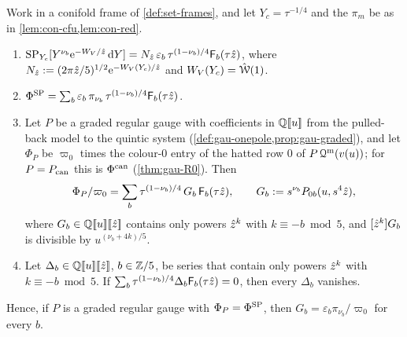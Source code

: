 \begin{lem}
\label{lem:con-id}
Work in a conifold frame of \cref{def:set-frames}, and let $Y_c=\tau^{-1/4}$ and the $\pi_m$ be as in \cref{lem:con-cfu,lem:con-red}.
\begin{enumerate}
\item[(a)] $\mathrm{SP}_{Y_c}[Y^{\nu_b}\mathrm{e}^{-W_V/\hat{z}}\,\mathrm{d} Y]=N_{\hat{z}}\,\varepsilon_b\,\tau^{(1-\nu_b)/4}\mathsf{F}_b(\tau\hat{z})$, where $N_{\hat{z}}:=(2\pi\hat{z}/5)^{1/2}\mathrm{e}^{-W_V(Y_c)/\hat{z}}$ and $W_V(Y_c)=\hat{\mathcal{W}}(1)$.
\item[(b)] $\Phi^{\mathrm{SP}}=\sum_b\varepsilon_b\,\pi_{\nu_b}\,\tau^{(1-\nu_b)/4}\mathsf{F}_b(\tau\hat{z})$.
\item[(c)] Let $P$ be a graded regular gauge with coefficients in $\mathbb{Q}[\![ u ]\!]$ from the pulled-back model to the quintic system (\cref{def:gau-onepole,prop:gau-graded}), and let $\Phi_P$ be $\varpi_0$ times the colour-$0$ entry of the hatted row $0$ of $P\,\mathcal{Q}^{\mathrm m}(v(u))$; for $P=P_{\mathrm{can}}$ this is $\Phi^{\mathrm{can}}$ (\cref{thm:gau-R0}). Then
\[
\Phi_P/\varpi_0=\sum_b\tau^{(1-\nu_b)/4}\,G_b\,\mathsf{F}_b(\tau\hat{z}),\qquad G_b:=s^{\nu_b}P_{0b}(u,s^4\hat{z}),
\]
where $G_b\in\mathbb{Q}[\![ u ]\!][\![ \hat{z} ]\!]$ contains only powers $\hat{z}^k$ with $k\equiv-b\bmod5$, and $[\hat{z}^k]G_b$ is divisible by $u^{(\nu_b+4k)/5}$.
\item[(d)] Let $\Delta_b\in\mathbb{Q}[\![ u ]\!][\![ \hat{z} ]\!]$, $b\in\mathbb{Z}/5$, be series that contain only powers $\hat{z}^k$ with $k\equiv-b\bmod5$. If $\sum_b\tau^{(1-\nu_b)/4}\Delta_b\mathsf{F}_b(\tau\hat{z})=0$, then every $\Delta_b$ vanishes.
\end{enumerate}
Hence, if $P$ is a graded regular gauge with $\Phi_P=\Phi^{\mathrm{SP}}$, then $G_b=\varepsilon_b\pi_{\nu_b}/\varpi_0$ for every $b$.
\end{lem}

